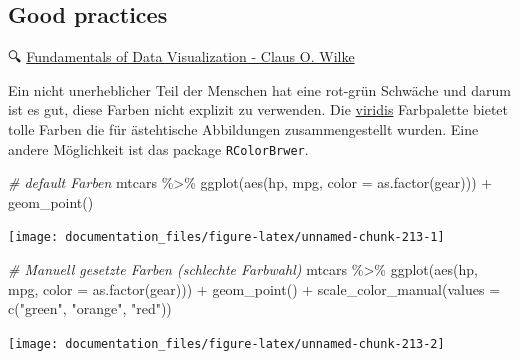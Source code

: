 \documentclass[
]{article}
\newenvironment{Shaded}{\begin{snugshade}}{\end{snugshade}}
\newcommand{\AttributeTok}[1]{\textcolor[rgb]{0.77,0.63,0.00}{#1}}
\newcommand{\CommentTok}[1]{\textcolor[rgb]{0.56,0.35,0.01}{\textit{#1}}}
\newcommand{\FunctionTok}[1]{\textcolor[rgb]{0.00,0.00,0.00}{#1}}
\newcommand{\NormalTok}[1]{#1}
\newcommand{\SpecialCharTok}[1]{\textcolor[rgb]{0.00,0.00,0.00}{#1}}
\newcommand{\StringTok}[1]{\textcolor[rgb]{0.31,0.60,0.02}{#1}}
\begin{document}
\hypertarget{good-practices}{%
\subsection{Good practices}\label{good-practices}}

🔍 \href{https://clauswilke.com/dataviz/index.html}{Fundamentals of Data Visualization - Claus O. Wilke}

Ein nicht unerheblicher Teil der Menschen hat eine rot-grün Schwäche und darum ist es gut, diese Farben nicht explizit zu verwenden. Die \href{https://www.thinkingondata.com/something-about-viridis-library/}{viridis} Farbpalette bietet tolle Farben die für ästehtische Abbildungen zusammengestellt wurden. Eine andere Möglichkeit ist das package \texttt{RColorBrwer}.

\begin{Shaded}
\begin{Highlighting}[]
\CommentTok{\# default Farben}
\NormalTok{mtcars }\SpecialCharTok{\%\textgreater{}\%}
  \FunctionTok{ggplot}\NormalTok{(}\FunctionTok{aes}\NormalTok{(hp, mpg, }\AttributeTok{color =} \FunctionTok{as.factor}\NormalTok{(gear))) }\SpecialCharTok{+}
  \FunctionTok{geom\_point}\NormalTok{()}
\end{Highlighting}
\end{Shaded}

\begin{center}\texttt{[image: documentation\_files/figure-latex/unnamed-chunk-213-1]} \end{center}

\begin{Shaded}
\begin{Highlighting}[]
\CommentTok{\# Manuell gesetzte Farben (schlechte Farbwahl)}
\NormalTok{mtcars }\SpecialCharTok{\%\textgreater{}\%}
  \FunctionTok{ggplot}\NormalTok{(}\FunctionTok{aes}\NormalTok{(hp, mpg, }\AttributeTok{color =} \FunctionTok{as.factor}\NormalTok{(gear))) }\SpecialCharTok{+}
  \FunctionTok{geom\_point}\NormalTok{() }\SpecialCharTok{+}
  \FunctionTok{scale\_color\_manual}\NormalTok{(}\AttributeTok{values =} \FunctionTok{c}\NormalTok{(}\StringTok{"green"}\NormalTok{, }\StringTok{"orange"}\NormalTok{, }\StringTok{"red"}\NormalTok{))}
\end{Highlighting}
\end{Shaded}

\begin{center}\texttt{[image: documentation\_files/figure-latex/unnamed-chunk-213-2]} \end{center}
\end{document}

